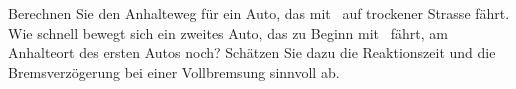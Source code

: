Berechnen Sie den Anhalteweg für ein Auto, das mit \vAaO\ auf trockener Strasse fährt. Wie schnell bewegt sich ein zweites Auto, das zu Beginn mit \vAbO\ fährt, am Anhalteort des ersten Autos noch? Schätzen Sie dazu die Reaktionszeit und die Bremsverzögerung bei einer Vollbremsung sinnvoll ab.
